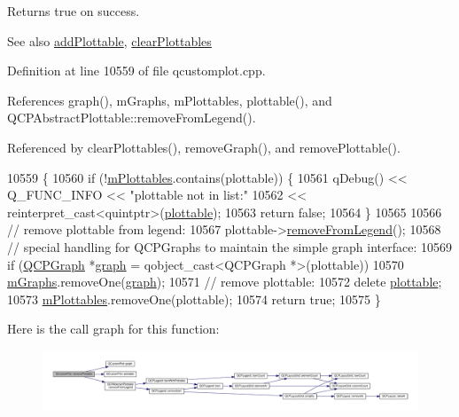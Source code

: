 Returns true on success.

\begin{DoxySeeAlso}{See also}
\hyperlink{class_q_custom_plot_ab7ad9174f701f9c6f64e378df77927a6}{add\+Plottable}, \hyperlink{class_q_custom_plot_a9a409bb3201878adb7ffba1c89c4e004}{clear\+Plottables} 
\end{DoxySeeAlso}


Definition at line 10559 of file qcustomplot.\+cpp.



References graph(), m\+Graphs, m\+Plottables, plottable(), and Q\+C\+P\+Abstract\+Plottable\+::remove\+From\+Legend().



Referenced by clear\+Plottables(), remove\+Graph(), and remove\+Plottable().


\begin{DoxyCode}
10559                                                                  \{
10560   \textcolor{keywordflow}{if} (!\hyperlink{class_q_custom_plot_a4b6c694fbdb2f201626f71eff2d1694e}{mPlottables}.contains(plottable)) \{
10561     qDebug() << Q\_FUNC\_INFO << \textcolor{stringliteral}{"plottable not in list:"}
10562              << \textcolor{keyword}{reinterpret\_cast<}quintptr\textcolor{keyword}{>}(\hyperlink{class_q_custom_plot_adea38bdc660da9412ba69fb939031567}{plottable});
10563     \textcolor{keywordflow}{return} \textcolor{keyword}{false};
10564   \}
10565 
10566   \textcolor{comment}{// remove plottable from legend:}
10567   plottable->\hyperlink{class_q_c_p_abstract_plottable_aa1f350e510326d012b9a9c9249736c83}{removeFromLegend}();
10568   \textcolor{comment}{// special handling for QCPGraphs to maintain the simple graph interface:}
10569   \textcolor{keywordflow}{if} (\hyperlink{class_q_c_p_graph}{QCPGraph} *\hyperlink{class_q_custom_plot_a80c40ced2a74eefe9e92de1e82ba2274}{graph} = qobject\_cast<QCPGraph *>(plottable))
10570     \hyperlink{class_q_custom_plot_a38676b141ac8005fca4882a73ddfaf59}{mGraphs}.removeOne(\hyperlink{class_q_custom_plot_a80c40ced2a74eefe9e92de1e82ba2274}{graph});
10571   \textcolor{comment}{// remove plottable:}
10572   \textcolor{keyword}{delete} \hyperlink{class_q_custom_plot_adea38bdc660da9412ba69fb939031567}{plottable};
10573   \hyperlink{class_q_custom_plot_a4b6c694fbdb2f201626f71eff2d1694e}{mPlottables}.removeOne(plottable);
10574   \textcolor{keywordflow}{return} \textcolor{keyword}{true};
10575 \}
\end{DoxyCode}


Here is the call graph for this function\+:\nopagebreak
\begin{figure}[H]
\begin{center}
\leavevmode
\includegraphics[width=350pt]{class_q_custom_plot_af3dafd56884208474f311d6226513ab2_cgraph}
\end{center}
\end{figure}




